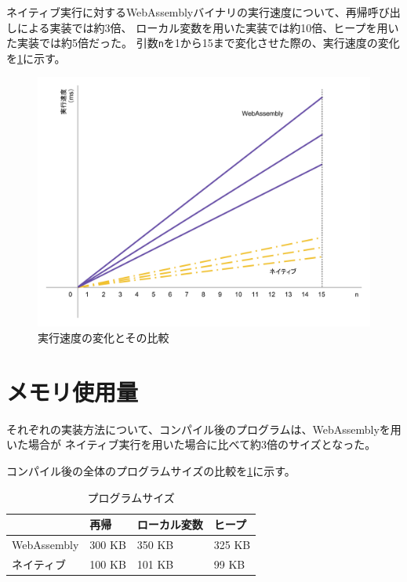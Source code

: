 ネイティブ実行に対するWebAssemblyバイナリの実行速度について、再帰呼び出しによる実装では約3倍、
ローカル変数を用いた実装では約10倍、ヒープを用いた実装では約5倍だった。
引数\verb|n|を1から15まで変化させた際の、実行速度の変化を\ref{fig:exec_time}に示す。

\begin{figure}[htbp]
  \caption{実行速度の変化とその比較}
  \label{fig:exec_time}
  \begin{center}
    \includegraphics[bb=0 0 800 600,width=12cm]{img/exec_time.pdf}
  \end{center}
\end{figure}

\section{メモリ使用量}

それぞれの実装方法について、コンパイル後のプログラムは、WebAssemblyを用いた場合が
ネイティブ実行を用いた場合に比べて約3倍のサイズとなった。

コンパイル後の全体のプログラムサイズの比較を\ref{tb:program_size}に示す。

\begin{table}[]
  \caption{プログラムサイズ}
  \label{tb:program_size}
  \begin{center}
    \begin{tabular}{|l|l|l|l|}
      \hline
      & 再帰 & ローカル変数 & ヒープ \\ \hline
      WebAssembly & 300 KB & 350 KB & 325 KB \\ \hline
      ネイティブ & 100 KB & 101 KB & 99 KB \\ \hline
    \end{tabular}
  \end{center}
\end{table}

